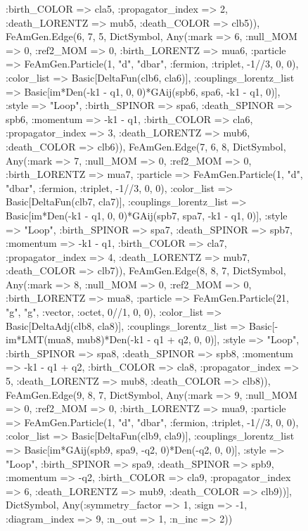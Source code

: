 \documentclass{revtex4}
\begin{document}
\begin{figure}[!htb]
\begin{center}
{:birth_COLOR => cla5, :propagator_index => 2, :death_LORENTZ => mub5, :death_COLOR => clb5)), FeAmGen.Edge(6, 7, 5, Dict{Symbol, Any}(:mark => 6, :null_MOM => 0, :ref2_MOM => 0, :birth_LORENTZ => mua6, :particle => FeAmGen.Particle(1, "d", "dbar", :fermion, :triplet, -1//3, 0, 0), :color_list => Basic[DeltaFun(clb6, cla6)], :couplings_lorentz_list => Basic[im*Den(-k1 - q1, 0, 0)*GAij(spb6, spa6, -k1 - q1, 0)], :style => "Loop", :birth_SPINOR => spa6, :death_SPINOR => spb6, :momentum => -k1 - q1, :birth_COLOR => cla6, :propagator_index => 3, :death_LORENTZ => mub6, :death_COLOR => clb6)), FeAmGen.Edge(7, 6, 8, Dict{Symbol, Any}(:mark => 7, :null_MOM => 0, :ref2_MOM => 0, :birth_LORENTZ => mua7, :particle => FeAmGen.Particle(1, "d", "dbar", :fermion, :triplet, -1//3, 0, 0), :color_list => Basic[DeltaFun(clb7, cla7)], :couplings_lorentz_list => Basic[im*Den(-k1 - q1, 0, 0)*GAij(spb7, spa7, -k1 - q1, 0)], :style => "Loop", :birth_SPINOR => spa7, :death_SPINOR => spb7, :momentum => -k1 - q1, :birth_COLOR => cla7, :propagator_index => 4, :death_LORENTZ => mub7, :death_COLOR => clb7)), FeAmGen.Edge(8, 8, 7, Dict{Symbol, Any}(:mark => 8, :null_MOM => 0, :ref2_MOM => 0, :birth_LORENTZ => mua8, :particle => FeAmGen.Particle(21, "g", "g", :vector, :octet, 0//1, 0, 0), :color_list => Basic[DeltaAdj(clb8, cla8)], :couplings_lorentz_list => Basic[-im*LMT(mua8, mub8)*Den(-k1 - q1 + q2, 0, 0)], :style => "Loop", :birth_SPINOR => spa8, :death_SPINOR => spb8, :momentum => -k1 - q1 + q2, :birth_COLOR => cla8, :propagator_index => 5, :death_LORENTZ => mub8, :death_COLOR => clb8)), FeAmGen.Edge(9, 8, 7, Dict{Symbol, Any}(:mark => 9, :null_MOM => 0, :ref2_MOM => 0, :birth_LORENTZ => mua9, :particle => FeAmGen.Particle(1, "d", "dbar", :fermion, :triplet, -1//3, 0, 0), :color_list => Basic[DeltaFun(clb9, cla9)], :couplings_lorentz_list => Basic[im*GAij(spb9, spa9, -q2, 0)*Den(-q2, 0, 0)], :style => "Loop", :birth_SPINOR => spa9, :death_SPINOR => spb9, :momentum => -q2, :birth_COLOR => cla9, :propagator_index => 6, :death_LORENTZ => mub9, :death_COLOR => clb9))], Dict{Symbol, Any}(:symmetry_factor => 1, :sign => -1, :diagram_index => 9, :n_out => 1, :n_inc => 2)) 
}
\end{center}
\end{figure}
\end{document}
